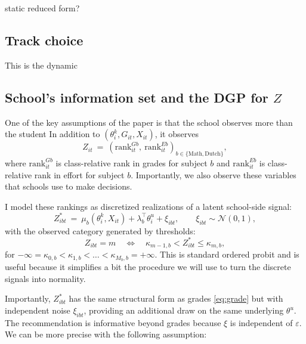 \documentclass{article}
\begin{document}
static reduced form?

\subsection{Track choice}

This is the dynamic





\subsection{School's information set and the DGP for $Z$}

One of the key assumptions of the paper is that the school observes more than the student In addition to $(\theta^k_i, G_{it}, X_{it})$, it observes
\begin{equation}
  Z_{it} \ =\ (\mathrm{rank}^{Gb}_{it},\ \mathrm{rank}^{Eb}_{it})_{b \in \{\mathrm{Math}, \mathrm{Dutch}\}},
  \label{eq:Z_observed}
\end{equation}
where $\mathrm{rank}^{Gb}_{it}$ is class-relative rank in grades for subject $b$ and $\mathrm{rank}^{Eb}_{it}$ is class-relative rank in effort for subject $b$. Importantly, we also observe these variables that schools use to make decisions. 

I model these rankings as discretized realizations of a latent school-side signal:
\begin{equation}
  Z^*_{ibt} \ =\ \mu_b(\theta^k_i, X_{it}) + \lambda_b^\top \theta^u_i + \xi_{ibt}, \qquad \xi_{ibt} \sim \mathcal{N}(0,1),
  \label{eq:Zstar}
\end{equation}
with the observed category generated by thresholds:
\begin{equation}
  Z_{ibt} = m \quad \Longleftrightarrow \quad \kappa_{m-1,b} < Z^*_{ibt} \le \kappa_{m,b},
  \label{eq:thresholds}
\end{equation}
for $-\infty = \kappa_{0,b} < \kappa_{1,b} < \dots < \kappa_{M_b,b} = +\infty$. This is standard ordered probit and is useful because it simplifies a bit the procedure we will use to turn the discrete signals into normality. 

Importantly, $Z^*_{ibt}$ has the same structural form as grades \eqref{eq:grade} but with independent noise $\xi_{ibt}$, providing an additional draw on the same underlying $\theta^u$. The recommendation is informative beyond grades because $\xi$ is independent of $\varepsilon$. We can be more precise with the following assumption:
\end{document}
